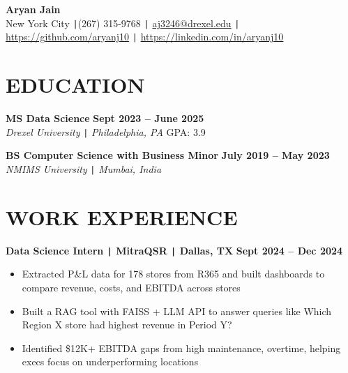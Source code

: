 \documentclass[10pt]{article}
\begin{document}
\begin{center}
    \textbf{\fontsize{18}{18}\selectfont Aryan Jain} \\
    New York City \texttt{|}(267) 315-9768 \texttt{|} \href{mailto:aj3246@drexel.edu}{aj3246@drexel.edu} \texttt{|}
    \href{https://github.com/aryanj10}{https://github.com/aryanj10} \texttt{|}  
    \href{https://linkedin.com/in/aryanj10}{https://linkedin.com/in/aryanj10}
\end{center}

\vspace{-0.7cm}
\section*{EDUCATION} 
\vspace{-0.2cm} 

\noindent 
\textbf{MS Data Science} \hfill \textbf{Sept 2023 -- June 2025} \\
\textit{Drexel University} \texttt{|} \textit{Philadelphia, PA} \hfill GPA: 3.9

\noindent 
\textbf{BS Computer Science with Business Minor} \hfill \textbf{July 2019 --  May 2023} \\
\textit{NMIMS University} \texttt{|} \textit{Mumbai, India} 



\vspace{-0.4cm}
\section*{WORK EXPERIENCE}

\vspace{-0.2cm}
\noindent
\textbf{Data Science Intern \texttt{|} MitraQSR \texttt{|} Dallas, TX} \hfill \textbf{Sept 2024 -- Dec 2024} 
\vspace{-0.15cm}
\begin{itemize}[leftmargin=0.5cm, itemsep=0pt]

    \item Extracted P\&L data for 178 stores from R365 and built dashboards to compare revenue, costs, and EBITDA across stores

    \item Built a RAG tool with FAISS + LLM API to answer queries like Which Region X store had highest revenue in Period Y?

    \item Identified \$12K+ EBITDA gaps from high maintenance, overtime, helping execs focus on underperforming locations

\end{itemize}
\end{document}
